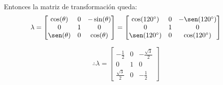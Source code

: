 Entonces la matriz de transformación queda:
\vspace{5 mm}
\begin{equation*}
    \lambda = \begin{bmatrix}
        \cos(\theta) & 0 & -\sin(\theta) \\
        0 & 1 & 0 \\
        \sen(\theta) & 0 & \cos(\theta)
       \end{bmatrix}
    = \begin{bmatrix}
        \cos(120^\circ) & 0 & -\sen(120^\circ) \\
        0 & 1 & 0 \\
        \sen(120^\circ) & 0 & \cos(120^\circ)
    \end{bmatrix}
\end{equation*}

\vspace{5 mm}
\begin{equation*}
    \therefore \lambda = \begin{bmatrix}
        -\frac{1}{2} & 0 & -\frac{\sqrt{3}}{2} \\
        0 & 1 & 0 \\
        \frac{\sqrt{3}}{2} & 0 & -\frac{1}{2}
    \end{bmatrix}
\end{equation*}